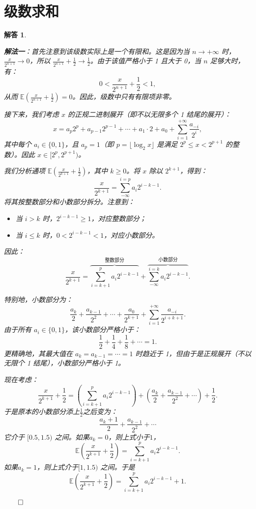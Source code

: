 \documentclass[12pt,UTF8]{ctexbook}
\theoremstyle{exercisestyle}
\theoremstyle{solutionstyle}
\newtheorem*{solution*}{解答}
\newenvironment{solution}
  {\begin{solution*}}
  {\hfill\ensuremath{\qed}\end{solution*}}
\begin{document}
\section{级数求和}\label{calcul-dune-somme}
\begin{solution}
\begin{subquestions}
\item \textbf{解法一}：首先注意到该级数实际上是一个有限和。这是因为当 $n \to +\infty$ 时，$\frac{x}{2^{n+1}} \to 0$，所以 $\frac{x}{2^{n+1}} + \frac{1}{2} \to \frac{1}{2}$。由于该值严格小于 1 且大于 0，当 $n$ 足够大时，有：
$$
0 < \frac{x}{2^{n+1}} + \frac{1}{2} < 1,
$$
从而 $\mathbb{E}\left(\frac{x}{2^{n+1}} + \frac{1}{2}\right) = 0$。因此，级数中只有有限项非零。

接下来，我们考虑 $x$ 的正规二进制展开（即不以无限多个 1 结尾的展开）：
$$
x = a_p 2^p + a_{p-1} 2^{p-1} + \cdots + a_1 \cdot 2 + a_0 + \sum_{i=1}^{+\infty} \frac{a_{-i}}{2^i},
$$
其中每个 $a_i \in \{0,1\}$，且 $a_p = 1$（即 $p = \lfloor \log_2 x \rfloor$ 是满足 $2^p \leq x < 2^{p+1}$ 的整数）。因此 $x \in [2^p, 2^{p+1})$。

我们分析通项 $\mathbb{E}\left(\frac{x}{2^{k+1}} + \frac{1}{2}\right)$，其中 $k \geq 0$。将 $x$ 除以 $2^{k+1}$，得到：
$$
\frac{x}{2^{k+1}} = \sum_{-\infty}^{i=p} a_i 2^{i - k - 1}.
$$
将其按整数部分和小数部分拆分。注意到：
\begin{itemize}
    \item 当 $i > k$ 时，$2^{i - k - 1} \geqslant 1$，对应整数部分；
    \item 当 $i \leqslant k$ 时，$0 < 2^{i - k - 1} < 1$，对应小数部分。
\end{itemize}
因此：
$$
\frac{x}{2^{k+1}} = \overbrace{\sum_{i=k+1}^{p} a_i 2^{i - k - 1}}^{\text{整数部分}} + \overbrace{\sum_{-\infty}^{i=k} a_i 2^{i - k - 1}}^{\text{小数部分}}.
$$

特别地，小数部分为：
$$
\frac{a_k}{2} + \frac{a_{k-1}}{2^2} + \cdots + \frac{a_0}{2^{k+1}} + \sum_{i=1}^{+\infty} \frac{a_{-i}}{2^{i + k + 1}}.
$$
由于所有 $a_i \in \{0,1\}$，该小数部分严格小于：
$$
\frac{1}{2} + \frac{1}{4} + \frac{1}{8} + \cdots = 1.
$$
更精确地，其最大值在 $a_k = a_{k-1} = \cdots = 1$ 时趋近于 1，但由于是正规展开（不以无限个 1 结尾），小数部分严格小于 1。

现在考虑：
$$
\frac{x}{2^{k+1}} + \frac{1}{2} = \left( \sum_{i=k+1}^{p} a_i 2^{i - k - 1} \right) + \left( \frac{a_k}{2} + \frac{a_{k-1}}{2^2} + \cdots \right) + \frac{1}{2}.
$$
于是原本的小数部分添上$\frac{1}{2}$之后变为：
$$
 \frac{a_k + 1}{2} + \frac{a_{k-1}}{2^2} + \cdots 
$$
它介于 $[0.5, 1.5)$ 之间。如果$a_k = 0$，则上式小于$1$，
$$
\mathbb{E}\left(\frac{x}{2^{k+1}} + \frac{1}{2}\right) = \sum_{i=k+1}^{p} a_i 2^{i - k - 1}.
$$
如果$a_k = 1$，则上式介于$[1, 1.5)$ 之间。于是
$$
\mathbb{E}\left(\frac{x}{2^{k+1}} + \frac{1}{2}\right) = \sum_{i=k+1}^{p} a_i 2^{i - k - 1} + 1.
$$


\end{subquestions}
\end{solution}
\end{document}
